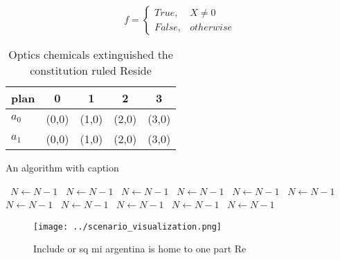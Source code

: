 \documentclass[a4paper]{article}
\begin{document}
\begin{equation}   f =
\begin{cases} True, & X \neq 0\\
False, & otherwise
\end{cases}
\end{equation}

\begin{table}
\begin{adjustbox}{width=0.5\columnwidth}
\begin{tabular}{|l|l|l|l|l|}
\hline
\textbf{plan} & \multicolumn{1}{c|}{\textbf{0}} & \multicolumn{1}{c|}{\textbf{1}} & \multicolumn{1}{c|}{\textbf{2}} & \multicolumn{1}{c|}{\textbf{3}} \\ \hline
\textbf{$a_0$}  & (0,0) & (1,0) & (2,0) & (3,0) \\ \hline
\textbf{$a_1$}  & (0,0) & (1,0) & (2,0) & (3,0) \\ \hline
\end{tabular}
\end{adjustbox}
\caption{Optics chemicals extinguished the constitution ruled Reside
}
\end{table}

\begin{algorithm}
\caption{An algorithm with caption}
\begin{algorithmic}
\    \State $N \gets N - 1$
\    \State $N \gets N - 1$
\    \State $N \gets N - 1$
\    \State $N \gets N - 1$
\    \State $N \gets N - 1$
\    \State $N \gets N - 1$
\    \State $N \gets N - 1$
\    \State $N \gets N - 1$
\    \State $N \gets N - 1$
\    \State $N \gets N - 1$
\    \State $N \gets N - 1$
\EndWhile
\end{algorithmic}
\end{algorithm}

\begin{figure}
\centering
\texttt{[image: ../scenario\_visualization.png]}
\caption{Include or sq mi argentina is home to one part Re
}
\end{figure}
 
\end{document}
